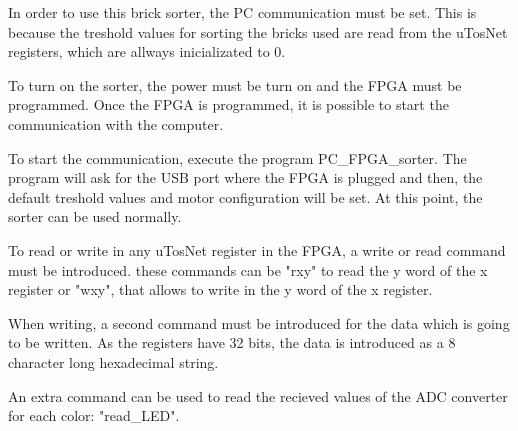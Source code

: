 
In order to use this brick sorter, the PC communication must be set. This is because the treshold values for sorting the bricks used are read from the uTosNet registers, which are allways inicializated to 0.

To turn on the sorter, the power must be turn on and the FPGA must be programmed.
Once the FPGA is programmed, it is possible to start the communication with the computer.

To start the communication, execute the program PC\_FPGA\_sorter. The program will ask for the USB port where the FPGA is plugged and then, the default treshold values and motor configuration will be set. At this point, the sorter can be used normally.

To read or write in any uTosNet register in the FPGA, a write or read command must be introduced. these commands can be "rxy" to read the y word of the x register or "wxy", that allows to write in the y word of the x register.

When writing, a second command must be introduced for the data which is going to be written. As the registers have 32 bits, the data is introduced as a 8 character long hexadecimal string.

An extra command can be used to read the recieved values of the ADC converter for each color: "read\_LED".



